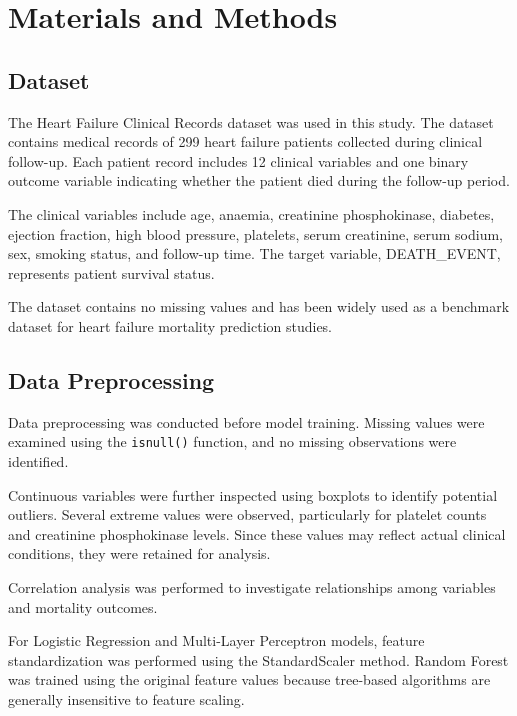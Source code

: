 \documentclass[twocolumn]{article}
\begin{document}

\section{Materials and Methods}

\subsection{Dataset}

The Heart Failure Clinical Records dataset was used in this study. The dataset contains medical records of 299 heart failure patients collected during clinical follow-up. Each patient record includes 12 clinical variables and one binary outcome variable indicating whether the patient died during the follow-up period.

The clinical variables include age, anaemia, creatinine phosphokinase, diabetes, ejection fraction, high blood pressure, platelets, serum creatinine, serum sodium, sex, smoking status, and follow-up time. The target variable, DEATH\_EVENT, represents patient survival status.

The dataset contains no missing values and has been widely used as a benchmark dataset for heart failure mortality prediction studies.

\subsection{Data Preprocessing}

Data preprocessing was conducted before model training. Missing values were examined using the \texttt{isnull()} function, and no missing observations were identified.

Continuous variables were further inspected using boxplots to identify potential outliers. Several extreme values were observed, particularly for platelet counts and creatinine phosphokinase levels. Since these values may reflect actual clinical conditions, they were retained for analysis.

Correlation analysis was performed to investigate relationships among variables and mortality outcomes.

For Logistic Regression and Multi-Layer Perceptron models, feature standardization was performed using the StandardScaler method. Random Forest was trained using the original feature values because tree-based algorithms are generally insensitive to feature scaling.
\end{document}
